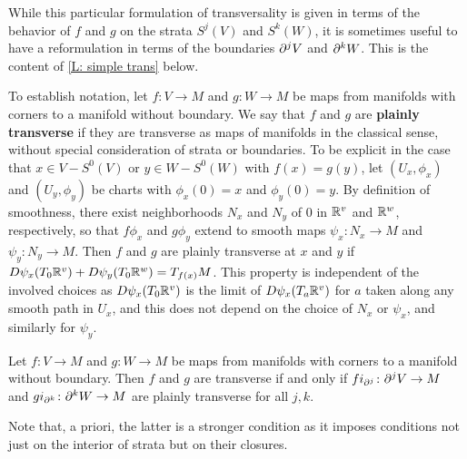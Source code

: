 While this particular formulation of transversality is given in terms of the behavior of $f$ and $g$ on the strata $S^j(V)$ and $S^k(W)$, it is sometimes useful to have a reformulation in terms of the boundaries $\partial^j V$ and $\partial^kW$.
This is the content of \cref{L: simple trans} below.

To establish notation, let $f \colon V\to M$ and $g \colon W\to M$ be maps from manifolds with corners to a manifold without boundary.
We say that $f$ and $g$ are \textbf{plainly transverse} if they are transverse as maps of manifolds in the classical sense, without special consideration of strata or boundaries.
To be explicit in the case that $x\in V-S^0(V)$ or $y\in W-S^0(W)$ with $f(x)=g(y)$, let $(U_x,\phi_x)$ and $(U_y,\phi_y)$ be charts with $\phi_x(0)=x$ and $\phi_y(0)=y$.
By definition of smoothness, there exist neighborhoods $N_x$ and $N_y$ of $0$ in $\mathbb{R}^v$ and $\mathbb{R}^w$, respectively, so that $f\phi_x$ and $g\phi_y$ extend to smooth maps $\psi_x \colon N_x\to M$ and $\psi_y \colon N_y\to M$.
Then $f$ and $g$ are plainly transverse at $x$ and $y$ if $D\psi_x(T_0 \mathbb{R}^v)+D\psi_y(T_0\mathbb{R}^w)=T_{f(x)}M$.
This property is independent of the involved choices as $D\psi_x(T_0 \mathbb{R}^v)$ is the limit of $D\psi_x(T_{a} \mathbb{R}^v)$ for $a$ taken along any smooth path in $U_x$, and this does not depend on the choice of $N_x$ or $\psi_x$, and similarly for $\psi_y$.

\begin{lemma}\label{L: simple trans}
	Let $f \colon V\to M$ and $g \colon W\to M$ be maps from manifolds with corners to a manifold without boundary.
	Then $f$ and $g$ are transverse if and only if $fi_{\partial^j} \colon \partial^jV\to M$ and $gi_{\partial^k} \colon \partial^kW \to M$ are plainly transverse for all $j,k$.
\end{lemma}

Note that, a priori, the latter is a stronger condition as it imposes conditions not just on the interior of strata but on their closures.

